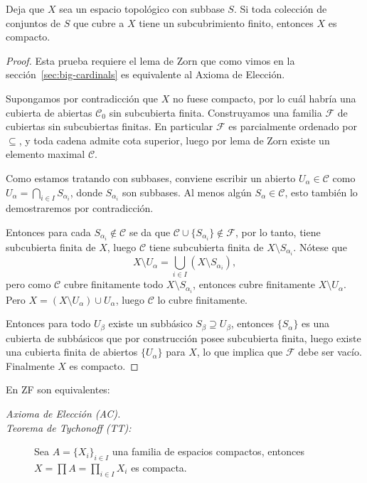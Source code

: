 \documentclass[11pt,oneside,a4paper]{book}
\begin{document}
\begin{lem}
Deja que $X$ sea un espacio topológico con subbase $S$. Si toda colección de conjuntos de $S$ que cubre a $X$ tiene un subcubrimiento finito, entonces $X$ es compacto.
\end{lem}
\begin{proof}
Esta prueba requiere el lema de Zorn que como vimos en la sección~\ref{sec:big-cardinals} es equivalente al Axioma de Elección.

Supongamos por contradicción que $X$ no fuese compacto, por lo cuál habría una cubierta de abiertas $\mathcal{C}_0$ sin subcubierta finita. Construyamos una familia $\mathcal{F}$ de cubiertas sin subcubiertas finitas. En particular $\mathcal{F}$ es parcialmente ordenado por $\subseteq$, y toda cadena admite cota superior, luego por lema de Zorn existe un elemento maximal $\mathcal{C}$.

Como estamos tratando con subbases, conviene escribir un abierto $U_\alpha\in\mathcal{C}$ como $U_\alpha=\bigcap_{i\in I}S_{\alpha_i}$, donde $S_{\alpha_i}$ son subbases. Al menos algún $S_\alpha\in\mathcal{C}$, esto también lo demostraremos por contradicción.

Entonces para cada $S_{\alpha_i}\notin\mathcal{C}$ se da que $\mathcal{C}\cup\{S_{\alpha_i}\}\notin\mathcal{F}$, por lo tanto, tiene subcubierta finita de $X$, luego $\mathcal{C}$ tiene subcubierta finita de $X\setminus S_{\alpha_i}$. Nótese que
$$X\setminus U_\alpha=\bigcup_{i\in I}(X\setminus S_{\alpha_i}),$$
pero como $\mathcal{C}$ cubre finitamente todo $X\setminus S_{\alpha_i}$, entonces cubre finitamente $X\setminus U_\alpha$. Pero $X=(X\setminus U_\alpha)\cup U_\alpha$, luego $\mathcal{C}$ lo cubre finitamente.

Entonces para todo $U_\beta$ existe un subbásico $S_\beta\supseteq U_\beta$, entonces $\{S_\alpha\}$ es una cubierta de subbásicos que por construcción posee subcubierta finita, luego existe una cubierta finita de abiertos $\{U_\alpha\}$ para $X$, lo que implica que $\mathcal{F}$ debe ser vacío. Finalmente $X$ es compacto.
\end{proof}
\begin{thm}
En ZF son equivalentes:
\begin{description}
\item[\color{thm}\sffamily\itshape Axioma de Elección (AC).]
\item[\color{thm}\sffamily\itshape Teorema de Tychonoff (TT):] Sea $A=\{X_i\}_{i\in I}$ una familia de espacios compactos, entonces $X=\prod A=\prod_{i\in I}X_i$ es compacta.
\end{description}
\end{thm}
\end{document}
